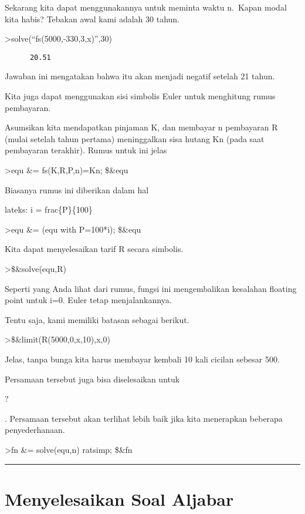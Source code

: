 \documentclass[
]{book}
\begin{document}
Sekarang kita dapat menggunakannya untuk meminta waktu n.~Kapan modal kita habis? Tebakan awal kami adalah 30 tahun.

\textgreater solve(``fs(5000,-330,3,x)'',30)

\begin{verbatim}
      20.51 
\end{verbatim}

Jawaban ini mengatakan bahwa itu akan menjadi negatif setelah 21 tahun.

Kita juga dapat menggunakan sisi simbolis Euler untuk menghitung rumus pembayaran.

Asumsikan kita mendapatkan pinjaman K, dan membayar n pembayaran R (mulai setelah tahun pertama) meninggalkan sisa hutang Kn (pada saat pembayaran terakhir). Rumus untuk ini jelas

\textgreater equ \&= fs(K,R,P,n)=Kn; \$\&equ

Biasanya rumus ini diberikan dalam hal

lateks: i = frac\{P\}\{100\}

\textgreater equ \&= (equ with P=100*i); \$\&equ

Kita dapat menyelesaikan tarif R secara simbolis.

\textgreater\$\&solve(equ,R)

Seperti yang Anda lihat dari rumus, fungsi ini mengembalikan kesalahan floating point untuk i=0. Euler tetap menjalankannya.

Tentu saja, kami memiliki batasan sebagai berikut.

\textgreater\$\&limit(R(5000,0,x,10),x,0)

Jelas, tanpa bunga kita harus membayar kembali 10 kali cicilan sebesar 500.

Persamaan tersebut juga bisa diselesaikan untuk

?

. Persamaan tersebut akan terlihat lebih baik jika kita menerapkan beberapa penyederhanaan.

\textgreater fn \&= solve(equ,n) \textbar{} ratsimp; \$\&fn

\begin{center}\rule{0.5\linewidth}{0.5pt}\end{center}

\chapter{Menyelesaikan Soal Aljabar}\label{menyelesaikan-soal-aljabar}
\end{document}

